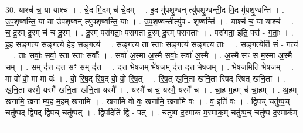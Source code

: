 \documentclass[17pt]{extarticle}
\begin{document}
30. याश्च॑ च॒ या याश्च॑ । . चे॒द मि॒दम् च॑ चे॒दम् । . इ॒द मु॑पशृ॒ण्वन् त्यु॑पशृ॒ण्वन्ती॒द मि॒द मु॑पशृ॒ण्वन्ति॑ । . उ॒प॒शृ॒ण्वन्ति॒ या या उ॑पशृ॒ण्वन् त्यु॑पशृ॒ण्वन्ति॒ याः । . उ॒प॒शृ॒ण्वन्तीत्यु॑प - शृ॒ण्वन्ति॑ । . याश्च॑ च॒ या याश्च॑ । . च॒ दू॒रम् दू॒रम् च॑ च दू॒रम् । . दू॒रम् परा॑गताः॒ परा॑गता दू॒रम् दू॒रम् परा॑गताः । . परा॑गता॒ इति॒ परा᳚ - ग॒ताः॒ । . इ॒ह स॒ङ्गत्य॑ स॒ङ्गत्ये॒ हेह स॒ङ्गत्य॑ । . स॒ङ्गत्य॒ ता स्ताः स॒ङ्गत्य॑ स॒ङ्गत्य॒ ताः । . स॒ङ्गत्येति॑ सं - गत्य॑ । . ताः सर्वाः॒ सर्वा॒ स्ता स्ताः सर्वाः᳚ । . सर्वा॑ अ॒स्मा अ॒स्मै सर्वाः॒ सर्वा॑ अ॒स्मै । . अ॒स्मै सꣳ स म॒स्मा अ॒स्मै सम् । . सम् द॑त्त दत्त॒ सꣳ सम् द॑त्त । . द॒त्त॒ भे॒ष॒जम् भे॑ष॒जम् द॑त्त दत्त भेष॒जम् । . भे॒ष॒जमिति॑ भेष॒जम् । . मा वो॑ वो॒ मा मा वः॑ । . वो॒ रि॒ष॒द् रि॒ष॒द् वो॒ वो॒ रि॒ष॒त् । . रि॒ष॒त् ख॒नि॒ता ख॑नि॒ता रि॑षद् रिषत् खनि॒ता । . ख॒नि॒ता यस्मै॒ यस्मै॑ खनि॒ता ख॑नि॒ता यस्मै᳚ । . यस्मै॑ च च॒ यस्मै॒ यस्मै॑ च । . चा॒ह म॒हम् च॑ चा॒हम् । . अ॒हम् खना॑मि॒ खना᳚ म्य॒ह म॒हम् खना॑मि । . खना॑मि वो वः॒ खना॑मि॒ खना॑मि वः । . व॒ इति॑ वः । . द्वि॒पच् चतु॑ष्प॒च् चतु॑ष्पद् द्वि॒पद् द्वि॒पच् चतु॑ष्पत् । . द्वि॒पदिति॑ द्वि - पत् । . चतु॑ष्प द॒स्माक॑ म॒स्माक॒म् चतु॑ष्प॒च् चतु॑ष्प द॒स्माक᳚म् । \newline
\end{document}
